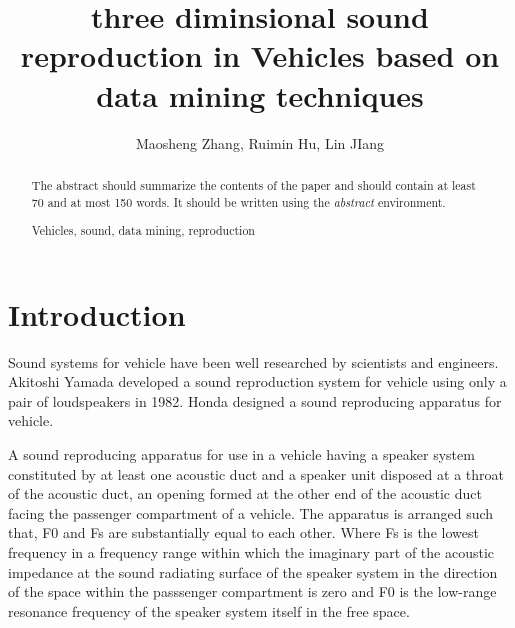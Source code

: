 \documentclass[runningheads,a4paper]{llncs}
\newcommand{\keywords}[1]{\par\addvspace\baselineskip
\noindent\keywordname\enspace\ignorespaces#1}
\begin{document}
\mainmatter  %

\title{ three diminsional sound reproduction in Vehicles based on data mining techniques }

%
%
\author{Maosheng Zhang, Ruimin Hu, Lin JIang}
%
%

\maketitle

\begin{abstract}
The abstract should summarize the contents of the paper and should
contain at least 70 and at most 150 words. It should be written using the
\emph{abstract} environment.
\keywords{Vehicles, sound, data mining, reproduction}
\end{abstract}


\section{Introduction}\label{sec:Intro}
Sound systems for vehicle have been well researched by scientists and engineers.   Akitoshi Yamada developed a sound reproduction system for vehicle using only a pair of loudspeakers in 1982\cite{Akito82}. Honda designed a sound reproducing apparatus for vehicle\cite{terai1990sound}. 

A sound reproducing apparatus for use in a vehicle having a speaker system constituted by at least one acoustic duct and a speaker unit disposed at a throat of the acoustic duct, an opening formed at the other end of the acoustic duct facing the passenger compartment of a vehicle. The apparatus is arranged such that, F0 and Fs are substantially equal to each other. Where Fs is the lowest frequency in a frequency range within which the imaginary part of the acoustic impedance at the sound radiating surface of the speaker system in the direction of the space within the passsenger compartment is zero and F0 is the low-range resonance frequency of the speaker system itself in the free space.
\end{document}
